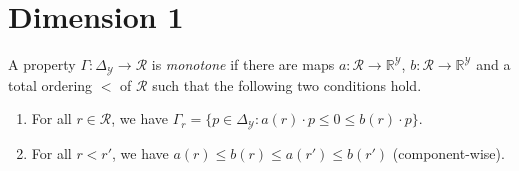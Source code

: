 \documentclass[anon,12pt]{colt2019}
\newcommand{\reals}{\mathbb{R}}
\newcommand{\simplex}{\Delta_\Y}
\newcommand{\R}{\mathcal{R}}
\newcommand{\Y}{\mathcal{Y}}
\begin{document}
\section{Dimension 1}\label{app:dimension-1}

\begin{definition}\label{def:monotone-prop}
  A property $\Gamma:\simplex\to\R$ is \emph{monotone} if there are maps $a:\R\to\reals^\Y$, $b:\R\to\reals^\Y$ and a total ordering $<$ of $\R$ such that the following two conditions hold.
  \begin{enumerate}
  \item For all $r\in\R$, we have $\Gamma_r = \{p\in\simplex : a(r) \cdot p \leq 0 \leq b(r) \cdot p\}$.
  \item For all $r < r'$, we have $a(r) \leq b(r) \leq a(r') \leq b(r')$ (component-wise).
  \end{enumerate}
\end{definition}
\end{document}
